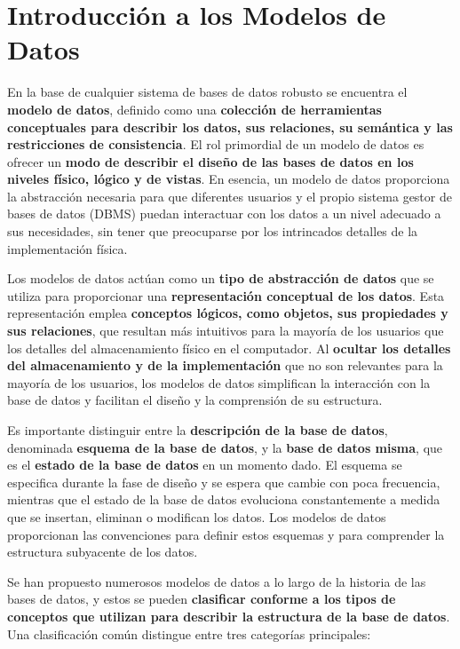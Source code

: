 \section{Introducción a los Modelos de Datos}

\noindent En la base de cualquier sistema de bases de datos robusto se encuentra el \textbf{modelo de datos}, definido como una \textbf{colección de herramientas conceptuales para describir los datos, sus relaciones, su semántica y las restricciones de consistencia}. El rol primordial de un modelo de datos es ofrecer un \textbf{modo de describir el diseño de las bases de datos en los niveles físico, lógico y de vistas}. En esencia, un modelo de datos proporciona la abstracción necesaria para que diferentes usuarios y el propio sistema gestor de bases de datos (DBMS) puedan interactuar con los datos a un nivel adecuado a sus necesidades, sin tener que preocuparse por los intrincados detalles de la implementación física.

\noindent Los modelos de datos actúan como un \textbf{tipo de abstracción de datos} que se utiliza para proporcionar una \textbf{representación conceptual de los datos}. Esta representación emplea \textbf{conceptos lógicos, como objetos, sus propiedades y sus relaciones}, que resultan más intuitivos para la mayoría de los usuarios que los detalles del almacenamiento físico en el computador. Al \textbf{ocultar los detalles del almacenamiento y de la implementación} que no son relevantes para la mayoría de los usuarios, los modelos de datos simplifican la interacción con la base de datos y facilitan el diseño y la comprensión de su estructura.

\noindent Es importante distinguir entre la \textbf{descripción de la base de datos}, denominada \textbf{esquema de la base de datos}, y la \textbf{base de datos misma}, que es el \textbf{estado de la base de datos} en un momento dado. El esquema se especifica durante la fase de diseño y se espera que cambie con poca frecuencia, mientras que el estado de la base de datos evoluciona constantemente a medida que se insertan, eliminan o modifican los datos. Los modelos de datos proporcionan las convenciones para definir estos esquemas y para comprender la estructura subyacente de los datos.

\noindent Se han propuesto numerosos modelos de datos a lo largo de la historia de las bases de datos, y estos se pueden \textbf{clasificar conforme a los tipos de conceptos que utilizan para describir la estructura de la base de datos}. Una clasificación común distingue entre tres categorías principales:

